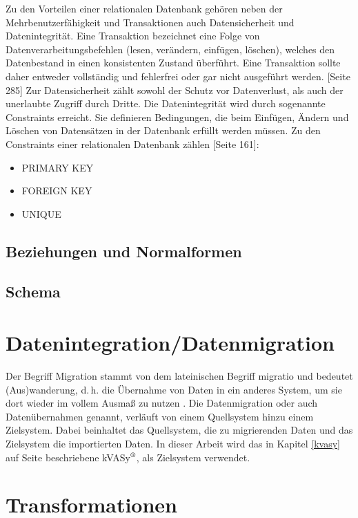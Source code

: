 Zu den Vorteilen einer relationalen Datenbank gehören neben der Mehrbenutzerfähigkeit und Transaktionen auch Datensicherheit und Datenintegrität.
Eine Transaktion bezeichnet eine Folge von Datenverarbeitungsbefehlen (lesen, verändern, einfügen, löschen), welches den Datenbestand in einen konsistenten Zustand überführt. Eine Transaktion sollte daher entweder vollständig und fehlerfrei oder gar nicht ausgeführt werden. \cite{Kemper2011}[Seite 285] Zur Datensicherheit zählt sowohl der Schutz vor Datenverlust, als auch der unerlaubte Zugriff durch Dritte. Die Datenintegrität wird durch sogenannte Constraints erreicht. Sie definieren Bedingungen, die beim Einfügen, Ändern und Löschen von Datensätzen in der Datenbank erfüllt werden müssen. Zu den Constraints einer relationalen Datenbank zählen \cite{Kemper2011}[Seite 161]:

\begin{itemize}
  \item PRIMARY KEY
  \item FOREIGN KEY
  \item UNIQUE
\end{itemize}

\subsection{Beziehungen und Normalformen}



\subsection{Schema}

\section{Datenintegration/Datenmigration}
Der Begriff Migration stammt von dem lateinischen Begriff migratio und bedeutet (Aus)wanderung, d.\,h. die Übernahme von
Daten in ein anderes System, um sie dort wieder im vollem Ausmaß zu nutzen \cite{duden:migra}.
Die Datenmigration oder auch Datenübernahmen genannt, verläuft von einem Quellsystem hinzu einem Zielsystem. Dabei beinhaltet das Quellsystem, die zu migrierenden Daten und das Zielsystem die importierten Daten. In dieser Arbeit wird das in Kapitel \ref{kvasy} auf Seite \pageref{kvasy} beschriebene kVASy$^\text{\textregistered}$, als Zielsystem verwendet. 

\section{Transformationen}

